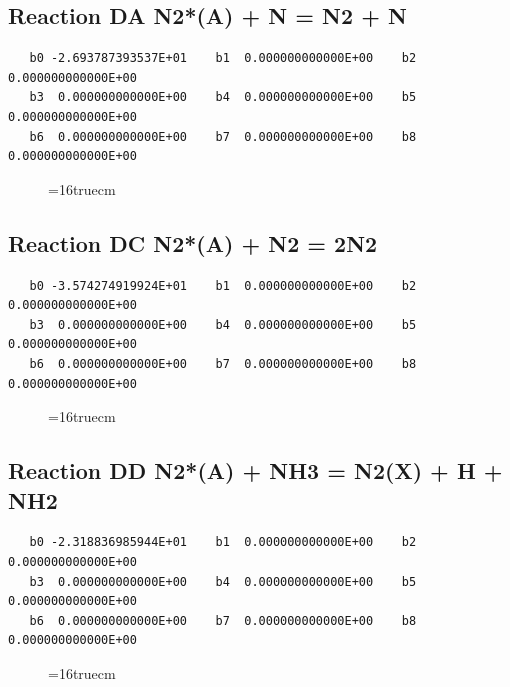 \documentclass[12pt,dvipdfm]{article}
\begin{document}
\subsection{
Reaction DA N2*(A) + N  = N2 + N}
\begin{small}\begin{verbatim}
   b0 -2.693787393537E+01    b1  0.000000000000E+00    b2  0.000000000000E+00
   b3  0.000000000000E+00    b4  0.000000000000E+00    b5  0.000000000000E+00
   b6  0.000000000000E+00    b7  0.000000000000E+00    b8  0.000000000000E+00
   \end{verbatim}\end{small}
\begin{figure}[h!]
\label{n2rates}
\epsfxsize=16truecm
\end{figure}
\newpage

\subsection{
Reaction DC N2*(A) + N2 =  2N2}
\begin{small}\begin{verbatim}
   b0 -3.574274919924E+01    b1  0.000000000000E+00    b2  0.000000000000E+00
   b3  0.000000000000E+00    b4  0.000000000000E+00    b5  0.000000000000E+00
   b6  0.000000000000E+00    b7  0.000000000000E+00    b8  0.000000000000E+00
   \end{verbatim}\end{small}
\begin{figure}[h!]
\label{n2rates}
\epsfxsize=16truecm
\end{figure}
\newpage

\subsection{
Reaction DD N2*(A) + NH3 =  N2(X) + H + NH2}
\begin{small}\begin{verbatim}
   b0 -2.318836985944E+01    b1  0.000000000000E+00    b2  0.000000000000E+00
   b3  0.000000000000E+00    b4  0.000000000000E+00    b5  0.000000000000E+00
   b6  0.000000000000E+00    b7  0.000000000000E+00    b8  0.000000000000E+00
   \end{verbatim}\end{small}
\begin{figure}[h!]
\label{n2rates}
\epsfxsize=16truecm
\end{figure}
\newpage
\end{document}
